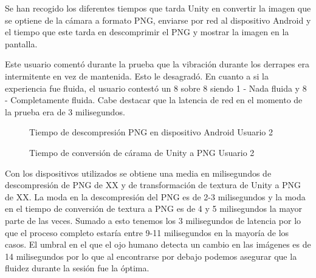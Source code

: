 \begin{enumerate}
Se han recogido los diferentes tiempos que tarda Unity en convertir la imagen que se optiene de la c\'amara a formato PNG, enviarse por red al dispositivo Android y el tiempo que este tarda en descomprimir el PNG y mostrar la imagen en la pantalla. 

Este usuario coment\'o durante la prueba que la vibraci\'on durante los derrapes era intermitente en vez de mantenida. Esto le desagrad\'o. En cuanto a si la experiencia fue fluida, el usuario contest\'o un 8 sobre 8 siendo 1 - Nada fluida y 8 - Completamente fluida. Cabe destacar que la latencia de red en el momento de la prueba era de 3 milisegundos.

\begin{figure}[!h]
\centering
{}%
\caption{Tiempo de descompresi\'on PNG en dispositivo Android Usuario 2}
\end{figure}

\begin{figure}[!h]
\centering
{}%
\caption{Tiempo de conversi\'on de c\'arama de Unity a PNG Usuario 2}
\end{figure}

Con los dispositivos utilizados se obtiene una media en milisegundos de descompresi\'on de PNG de XX y de transformaci\'on de textura de Unity a PNG de XX. La moda en la descompresi\'on del PNG es de 2-3 milisegundos y la moda en el tiempo de conversi\'on de textura a PNG es de 4 y 5 milisegundos la mayor parte de las veces. Sumado a esto tenemos los 3 milisegundos de latencia por lo que el proceso completo estar\'ia entre 9-11 milisegundos en la mayor\'ia de los casos. El umbral en el que el ojo humano detecta un cambio en las im\'agenes es de 14 milisegundos por lo que al encontrarse por debajo podemos asegurar que la fluidez durante la sesi\'on fue la \'optima.


\end{enumerate}

